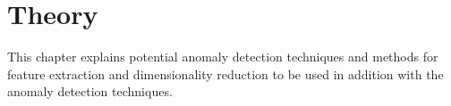 \chapter{Theory}\label{cha:litterature}

This chapter explains potential anomaly detection techniques and methods for feature extraction and dimensionality reduction to be used in addition with the anomaly detection techniques. 

    
